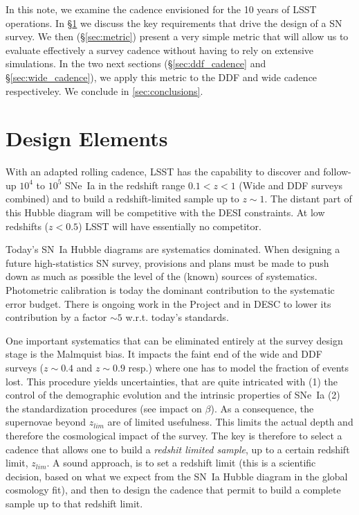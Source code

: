 \documentclass[\docopts]{\docclass}
\begin{document}
In this note, we examine the cadence envisioned for the 10 years of
LSST operations.  In \S\ref{sec:design_notes} we discuss the key
requirements that drive the design of a SN survey.  We then
(\S\ref{sec:metric}) present a very simple metric that will allow us
to evaluate effectively a survey cadence without having to rely on
extensive simulations.  In the two next sections
(\S\ref{sec:ddf_cadence} and \S\ref{sec:wide_cadence}), we apply this
metric to the  DDF and wide cadence respectiveley. We
conclude in \ref{sec:conclusions}.







\section{Design Elements}
\label{sec:design_notes}

With an adapted rolling cadence, LSST has the capability to discover
and follow-up  $10^4$ to $10^5$ SNe~Ia in the redshift range $0.1 < z <
1$ (Wide and DDF surveys combined) and to build a redshift-limited
sample up to $z \sim 1$. The distant part of this Hubble diagram will
be competitive with the DESI constraints. At low redshifts ($z < 0.5$)
LSST will have essentially no competitor.

Today's SN~Ia Hubble diagrams are systematics dominated.  When
designing a future high-statistics SN survey, provisions and plans
must be made to push down as much as possible the level of the (known)
sources of systematics. Photometric calibration is today the dominant
contribution to the systematic error budget.  There is ongoing work in
the Project and in DESC to lower its contribution by a factor $\sim 5$
w.r.t.  today's standards.

One important systematics that can be eliminated entirely at the
survey design stage is the Malmquist bias.  It impacts the faint end
of the wide and DDF surveys ($z \sim 0.4$ and $z \sim 0.9$ resp.)
where one has to model the fraction of events lost.  This procedure
yields uncertainties, that are quite intricated with (1) the control
of the demographic evolution and the intrinsic properties of SNe~Ia
(2) the standardization procedures (see impact on $\beta$).  As a
consequence, the supernovae beyond $z_{lim}$ are of limited
usefulness.  This limits the actual depth and therefore the
cosmological impact of the survey. The key is therefore to select a
cadence that allows one to build a {\em redshit limited sample}, up to
a certain redshift limit, $z_{lim}$. A sound approach, is to set a
redshift limit (this is a scientific decision, based on what we expect
from the SN~Ia Hubble diagram in the global cosmology fit), and then
to design the cadence that permit to build a complete sample up to
that redshift limit.
\end{document}
